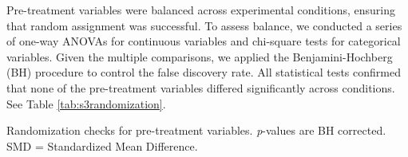 \documentclass[11pt]{report}
\begin{document}
\begin{append}
\begin{table}[ht]
    \label{tab:s3missingness}
\end{table}

Pre-treatment variables were balanced across experimental conditions, ensuring that random assignment was successful. To assess balance, we conducted a series of one-way ANOVAs for continuous variables and chi-square tests for categorical variables. Given the multiple comparisons, we applied the Benjamini-Hochberg (BH) procedure to control the false discovery rate. All statistical tests confirmed that none of the pre-treatment variables differed significantly across conditions. See Table \ref{tab:s3randomization}.

\begin{table}[ht]
    \centering
\caption{Randomization checks for pre-treatment variables. \textit{p}-values are BH corrected. SMD = Standardized Mean Difference.}


\end{table}
\end{append}
\end{document}
